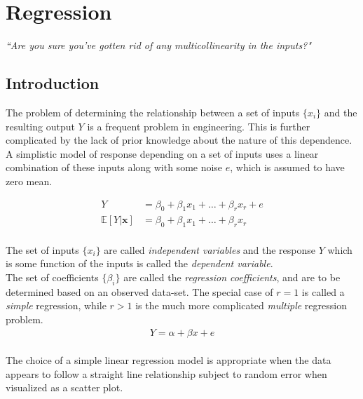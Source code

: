 \chapter{Regression}


\begin{flushright}
	\textit{``Are you sure you've gotten rid of any multicollinearity in the inputs?"} \\
\end{flushright}

\section{Introduction}

The problem of determining the relationship between a set of inputs $ \{x_i\} $ and the resulting output $ Y $ is a frequent problem in engineering. This is further complicated by the lack of prior knowledge about the nature of this dependence.\\

A simplistic model of response depending on a set of inputs uses a linear combination of these inputs along with some noise $ e $, which is assumed to have zero mean.

\begin{align}
	Y &= \beta_0 + \beta_1 x_1 + \dots + \beta_r x_r + e\\
	\mathbb{E}[Y|\textbf{x}] &= \beta_0 + \beta_1 x_1 + \dots + \beta_r x_r	
\end{align}\\

The set of inputs $ \{x_i\} $ are called \textit{independent variables} and the response $ Y $ which is some function of the inputs is called the \textit{dependent variable}.\\

The set of coefficients $ \{\beta_i\} $ are called the \textit{regression coefficients}, and are to be determined based on an observed data-set. The special case of $ r = 1 $ is called a \textit{simple} regression, while $ r > 1 $ is the much more complicated \textit{multiple} regression problem.\\

\begin{align}
	Y = \alpha + \beta x + e
\end{align}\\

The choice of a simple linear regression model is appropriate when the data appears to follow a straight line relationship subject to random error when visualized as a scatter plot.\\

